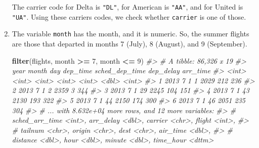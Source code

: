 \documentclass[]{book}
\newenvironment{Shaded}{\begin{snugshade}}{\end{snugshade}}
\newcommand{\CommentTok}[1]{\textcolor[rgb]{0.56,0.35,0.01}{\textit{#1}}}
\newcommand{\DecValTok}[1]{\textcolor[rgb]{0.00,0.00,0.81}{#1}}
\newcommand{\KeywordTok}[1]{\textcolor[rgb]{0.13,0.29,0.53}{\textbf{#1}}}
\newcommand{\NormalTok}[1]{#1}
\newcommand{\OperatorTok}[1]{\textcolor[rgb]{0.81,0.36,0.00}{\textbf{#1}}}
\newcommand{\StringTok}[1]{\textcolor[rgb]{0.31,0.60,0.02}{#1}}
\theoremstyle{plain}
\theoremstyle{remark}
\begin{document}
\begin{enumerate}
  The carrier code for Delta is \texttt{"DL"}, for American is
  \texttt{"AA"}, and for United is \texttt{"UA"}. Using these carriers
  codes, we check whether \texttt{carrier} is one of those.

\begin{Shaded}
\end{Shaded}
\item
  The variable \texttt{month} has the month, and it is numeric. So, the
  summer flights are those that departed in months 7 (July), 8 (August),
  and 9 (September).

\begin{Shaded}
\begin{Highlighting}[]
\KeywordTok{filter}\NormalTok{(flights, month }\OperatorTok{>=}\StringTok{ }\DecValTok{7}\NormalTok{, month }\OperatorTok{<=}\StringTok{ }\DecValTok{9}\NormalTok{)}
\CommentTok{#> # A tibble: 86,326 x 19}
\CommentTok{#>    year month   day dep_time sched_dep_time dep_delay arr_time}
\CommentTok{#>   <int> <int> <int>    <int>          <int>     <dbl>    <int>}
\CommentTok{#> 1  2013     7     1        1           2029       212      236}
\CommentTok{#> 2  2013     7     1        2           2359         3      344}
\CommentTok{#> 3  2013     7     1       29           2245       104      151}
\CommentTok{#> 4  2013     7     1       43           2130       193      322}
\CommentTok{#> 5  2013     7     1       44           2150       174      300}
\CommentTok{#> 6  2013     7     1       46           2051       235      304}
\CommentTok{#> # ... with 8.632e+04 more rows, and 12 more variables:}
\CommentTok{#> #   sched_arr_time <int>, arr_delay <dbl>, carrier <chr>, flight <int>,}
\CommentTok{#> #   tailnum <chr>, origin <chr>, dest <chr>, air_time <dbl>,}
\CommentTok{#> #   distance <dbl>, hour <dbl>, minute <dbl>, time_hour <dttm>}
\end{Highlighting}
\end{Shaded}


\end{enumerate}
\end{document}
